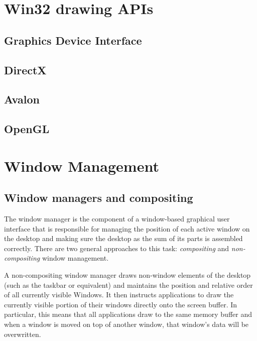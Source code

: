 \documentclass[10pt,twocolumn,a4paper,os=win]{article}
\begin{document}
	\section{Win32 drawing APIs}
		\subsection{Graphics Device Interface}

		\subsection{DirectX}

		\subsection{Avalon}\label{sec:milcore}

		\subsection{OpenGL}


	\section{Window Management}
		\subsection{Window managers and compositing}
			The window manager is the component of a window-based graphical user
			interface that is responsible for managing the position of each active
			window on the desktop and making sure the desktop as the sum of its
			parts is assembled correctly. There are two general approaches to this
			task: \emph{compositing} and \emph{non-compositing} window management.

			A non-compositing window manager draws non-window elements of the
			desktop (such as the taskbar or equivalent) and maintains the
			position and relative order of all currently visible Windows. It
			then instructs applications to draw the currently visible portion
			of their windows directly onto the screen buffer. In particular,
			this means that all applications draw to the same memory buffer and
			when a window is moved on top of another window, that window's data
			will be overwritten.
\end{document}
